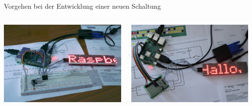 \begin{frame}[allowframebreaks]{Vorgehen bei der Entwicklung einer neuen Schaltung}
    \bigskip

    \begin{columns}
        \includegraphics[width=\textwidth]{2-hardwaredesign/img/vorgehen_breadboard}

        \includegraphics[width=\textwidth]{2-hardwaredesign/img/vorgehen_lochrasterplatine}
    \end{columns}
\end{frame}

